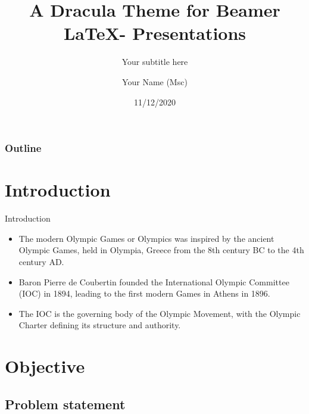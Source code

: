 \documentclass[xcolor=table]{beamer}
\title[A Dracula Theme for Beamer \LaTeX]{A Dracula Theme for Beamer  \LaTeX - Presentations} %
\subtitle{Your subtitle here}
\author[Your Name (Msc) ]{Your Name (Msc) } %
\institute[YIN] %
{

IWIM 2020\\
Institute of xxx\\
University of xxx \\

}
\date{11/12/2020} %
\begin{document}
\begin{frame}[plain]
\titlepage %
\end{frame}

\begin{frame}
\frametitle{Outline} %
\tableofcontents %
\end{frame}

\section{Introduction}
\begin{frame}{Introduction}
    \begin{itemize}
        \item The modern Olympic Games or Olympics was inspired by the ancient Olympic Games, held in Olympia, Greece from the 8th century BC to the 4th century AD. 
        \item Baron Pierre de Coubertin founded the International Olympic Committee (IOC) in 1894, leading to the first modern Games in Athens in 1896. 
        \item The IOC is the governing body of the Olympic Movement, with the Olympic Charter defining its structure and authority.
\end{itemize}
\end{frame}



\section{Objective}
\subsection{Problem statement}
\end{document}
